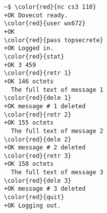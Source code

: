 \documentclass[varwidth=15em,crop]{standalone}
\begin{document}
\begin{Verbatim}[commandchars=\\\{\}]
~$ \color{red}{nc cs3 110}
+OK Dovecot ready.
\color{red}{user wx672}
+OK
\color{red}{pass topsecrete}
+OK Logged in.
\color{red}{stat}
+OK 3 459
\color{red}{retr 1}
+OK 146 octets
  The full text of message 1
\color{red}{dele 1}
+OK message # 1 deleted
\color{red}{retr 2}
+OK 155 octets
  The full text of message 2
\color{red}{dele 2}
+OK message # 2 deleted
\color{red}{retr 3}
+OK 158 octets
  The full text of message 3
\color{red}{dele 3}
+OK message # 3 deleted
\color{red}{quit}
+OK Logging out.
\end{Verbatim}
\end{document}
